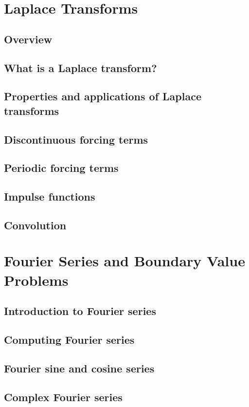 \documentclass{article}
\begin{document}
\pagebreak
\section{Laplace Transforms}
\subsection*{Overview}

\subsection{What is a Laplace transform?}
\subsection{Properties and applications of Laplace transforms}
\subsection{Discontinuous forcing terms}
\subsection{Periodic forcing terms}
\subsection{Impulse functions}
\subsection{Convolution}

\pagebreak
\section{Fourier Series and Boundary Value Problems}

\subsection{Introduction to Fourier series}
\subsection{Computing Fourier series}
\subsection{Fourier sine and cosine series}
\subsection{Complex Fourier series}
\end{document}
